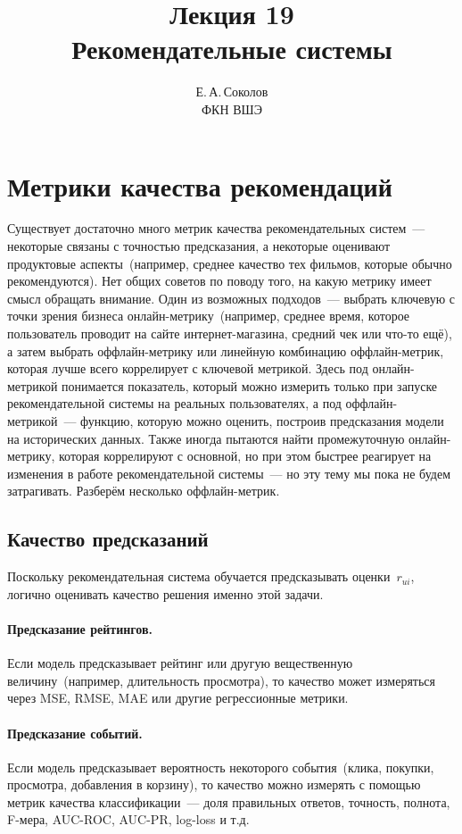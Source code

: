 \documentclass[12pt,fleqn]{article}
\begin{document}
\title{Лекция 19\\Рекомендательные системы}
\author{Е.\,А.\,Соколов\\ФКН ВШЭ}
\maketitle

\section{Метрики качества рекомендаций}

Существует достаточно много метрик качества рекомендательных систем~--- некоторые связаны
с точностью предсказания, а некоторые оценивают продуктовые аспекты~(например, среднее
качество тех фильмов, которые обычно рекомендуются).
Нет общих советов по поводу того, на какую метрику имеет смысл обращать внимание.
Один из возможных подходов~--- выбрать ключевую с точки зрения бизнеса онлайн-метрику~(например,
среднее время, которое пользователь проводит на сайте интернет-магазина, средний чек или что-то ещё),
а затем выбрать оффлайн-метрику или линейную комбинацию оффлайн-метрик, которая лучше
всего коррелирует с ключевой метрикой.
Здесь под онлайн-метрикой понимается показатель, который можно измерить
только при запуске рекомендательной системы на реальных пользователях,
а под оффлайн-метрикой~--- функцию, которую можно оценить, построив
предсказания модели на исторических данных.
Также иногда пытаются найти промежуточную онлайн-метрику, которая коррелируют с основной,
но при этом быстрее реагирует на изменения в работе рекомендательной системы~--- но эту
тему мы пока не будем затрагивать.
Разберём несколько оффлайн-метрик.

\subsection{Качество предсказаний}
Поскольку рекомендательная система обучается предсказывать оценки~$r_{ui}$,
логично оценивать качество решения именно этой задачи.

\paragraph{Предсказание рейтингов.}
Если модель предсказывает рейтинг или другую вещественную величину~(например, длительность просмотра),
то качество может измеряться через MSE, RMSE, MAE или другие регрессионные метрики.

\paragraph{Предсказание событий.}
Если модель предсказывает вероятность некоторого события~(клика, покупки, просмотра, добавления в корзину),
то качество можно измерять с помощью метрик качества классификации~--- доля правильных ответов, точность, полнота, F-мера,
AUC-ROC, AUC-PR, log-loss и т.д.
\end{document}
